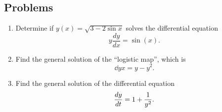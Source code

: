 \documentclass{article}
\begin{document}
\subsection{Problems}

\begin{enumerate}
\item Determine if $y(x) = \sqrt{3-2\sin x}$ solves the differential
  equation
  \begin{equation*}
    y\frac{dy}{dx}=\sin(x).
  \end{equation*}

\item Find the general solution of the ``logistic map'', which is
  \begin{equation*}
    \dd{y}{x} = y - y^2.
  \end{equation*}

\item Find the general solution of the differential equation
  \begin{equation*}
    \frac{d y}{d t} = 1 + \frac{1}{y^2}.
  \end{equation*}


\end{enumerate}
\end{document}

